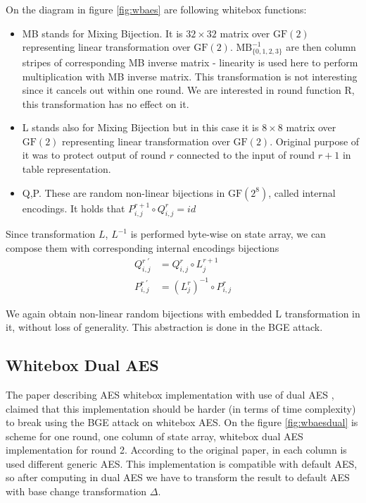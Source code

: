 \documentclass[11pt,oneside,final]{fithesis2}
\newcommand{\gfe}{\ensuremath{\text{GF}\left(2^8\right)}}
\begin{document}
	On the diagram in figure \ref{fig:wbaes} are following whitebox functions:
	\begin{itemize}
	\item MB stands for Mixing Bijection. It is $32 \times 32$ matrix over $\text{GF}(2)$ representing linear transformation over $\text{GF}(2)$. 
	$\text{MB}^{-1}_{\{0,1,2,3\}}$ are then column stripes of corresponding MB inverse matrix - linearity is used here to perform multiplication with MB inverse matrix.
	This transformation is not interesting since it cancels out within one round. We are interested in round function R, this transformation has no effect on it.
	\item L stands also for Mixing Bijection but in this case it is $8 \times 8$ matrix over $\text{GF}(2)$ representing linear transformation over $\text{GF}(2)$. 
	Original purpose of it was to protect output of round $r$ connected to the input of round $r+1$ in table representation. 
	\item Q,P. These are random non-linear bijections in $\gfe$, called internal encodings. It holds that $P^{r+1}_{i,j} \circ Q^{r}_{i,j} = id$
	\end{itemize}

	Since transformation $L$, $L^{-1}$ is performed byte-wise on state array, we can compose them with corresponding internal encodings bijections
	\begin{subequations} \label{eq:ioencoding_abstract_q}
	\begin{align}
	    Q^{r \; \prime}_{i,j} &= Q^{r}_{i,j} \circ L^{r+1}_{j} \\
	    P^{r \; \prime}_{i,j} &= (L^{r}_{j})^{-1} \circ P^{r}_{i,j}
	\end{align}
	\end{subequations}

	We again obtain non-linear random bijections with embedded L transformation in it, without loss of generality. This abstraction is done in the BGE attack.
	
	\subsection{Whitebox Dual AES}\label{sec:wb_dual_aes}
	The paper describing AES whitebox implementation with use of dual AES \citep{Karroumi:2010:PWA:2041036.2041060}, claimed that this implementation should be harder (in terms of time complexity)
	to break using the BGE attack on whitebox AES. On the figure \ref{fig:wbaesdual} is scheme for one round, one column of state array, whitebox dual AES implementation for round 2.
	According to the original paper, in each
	column is used different generic AES. This implementation is compatible with default AES, so after computing in dual AES we have to transform the result to default AES
	with base change transformation $\Delta$.\\
\end{document}

